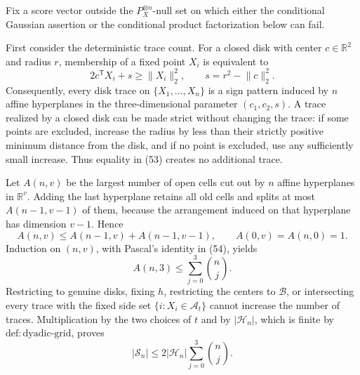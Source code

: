 Fix a score vector outside the \(P_X^{\otimes n}\)-null set on which either the conditional Gaussian assertion or the conditional product factorization below can fail.

First consider the deterministic trace count.  For a closed disk with center \(c\in\mathbb R^2\) and radius \(r\), membership of a fixed point \(X_i\) is equivalent to
\[
 2c^{\mathsf T}X_i+s\ge \lVert X_i\rVert_2^2,
 \qquad s=r^2-\lVert c\rVert_2^2. \tag{53}
\]
Consequently, every disk trace on \(\{X_1,\ldots,X_n\}\) is a sign pattern induced by \(n\) affine hyperplanes in the three-dimensional parameter \((c_1,c_2,s)\).  A trace realized by a closed disk can be made strict without changing the trace: if some points are excluded, increase the radius by less than their strictly positive minimum distance from the disk, and if no point is excluded, use any sufficiently small increase.  Thus equality in (53) creates no additional trace.

Let \(A(n,v)\) be the largest number of open cells cut out by \(n\) affine hyperplanes in \(\mathbb R^v\).  Adding the last hyperplane retains all old cells and splits at most \(A(n-1,v-1)\) of them, because the arrangement induced on that hyperplane has dimension \(v-1\).  Hence
\[
 A(n,v)\le A(n-1,v)+A(n-1,v-1),
 \qquad A(0,v)=A(n,0)=1. \tag{54}
\]
Induction on \((n,v)\), with Pascal's identity in (54), yields
\[
 A(n,3)\le\sum_{j=0}^3\binom nj. \tag{55}
\]
Restricting to genuine disks, fixing \(h\), restricting the centers to \(\mathcal B\), or intersecting every trace with the fixed side set \(\{i:X_i\in\mathcal A_t\}\) cannot increase the number of traces.  Multiplication by the two choices of \(t\) and by \(|\mathcal H_n|\), which is finite by \(\mathrm{def:dyadic\text{-}grid}\), proves
\[
 |\mathscr S_n|\le2|\mathcal H_n|\sum_{j=0}^3\binom nj.
\]

